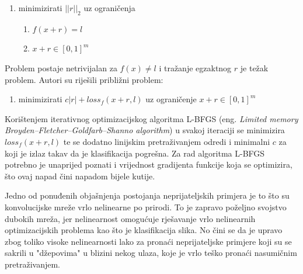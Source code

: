 \documentclass[utf8, diplomski]{fer}
\begin{document}
\begin{enumerate}[noitemsep, label=\textbullet]
  \item minimizirati $||r||_{2}$ uz ograničenja
  \begin{enumerate}
  \item $f(x+r) = l$
  \item $x + r \in [0, 1]^{m}$
  \end{enumerate}
\end{enumerate}
Problem postaje netrivijalan za $f(x) \neq l$ i tražanje egzaktnog $r$ je težak problem. Autori su riješili približni problem:
\begin{enumerate}[noitemsep, label=\textbullet]
  \item minimizirati $c|r| + loss_{f}(x + r, l)$ uz ograničenje $x + r \in [0, 1]^{m}$
\end{enumerate}
Korištenjem iterativnog optimizacijskog algoritma L-BFGS (eng. \textit{Limited memory Broyden–Fletcher–Goldfarb–Shanno algorithm}) u svakoj iteraciji se minimizira $loss_{f}(x + r, l)$ te se dodatno linijskim pretraživanjem odredi i minimalni $c$ za koji je izlaz takav da je klasifikacija pogrešna. Za rad algoritma L-BFGS potrebno je unaprijed poznati i vrijednost gradijenta funkcije koja se optimizira, što ovaj napad čini napadom bijele kutije. \par
Jedno od ponuđenih objašnjenja postojanja neprijateljskih primjera je to što su konvolucijske mreže vrlo nelinearne po prirodi. To je zapravo poželjno svojstvo dubokih mreža, jer nelinearnost omogućuje rješavanje vrlo nelinearnih optimizacijskih problema kao što je klasifikacija slika. No čini se da je upravo zbog toliko visoke nelinearnosti lako za pronaći neprijateljske primjere koji su se sakrili u "džepovima" u blizini nekog ulaza, koje je vrlo teško pronaći nasumičnim pretraživanjem. 
\end{document}
